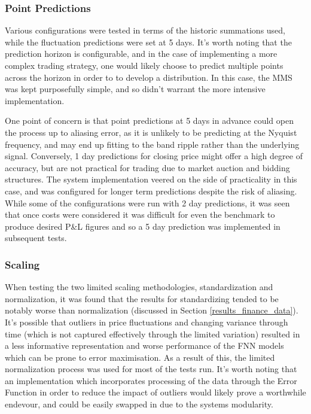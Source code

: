 \documentclass[a4paper,11pt,oneside]{article}
\theoremstyle{plain}
\theoremstyle{definition}
\begin{document}
	\subsubsection {Point Predictions} Various configurations were tested in terms of the historic summations used, while the fluctuation predictions were set at 5 days. It's worth noting that the prediction horizon is configurable, and in the case of implementing a more complex trading strategy, one would likely choose to predict multiple points across the horizon in order to to develop a distribution. In this case, the MMS was kept purposefully simple, and so didn't warrant the more intensive implementation. \newline
	
	One point of concern is that point predictions at 5 days in advance could open the process up to aliasing error, as it is unlikely to be predicting at the Nyquist frequency, and may end up fitting to the band ripple rather than the underlying signal. Conversely, 1 day predictions for closing price might offer a high degree of accuracy, but are not practical for trading due to market auction and bidding structures. The system implementation veered on the side of practicality in this case, and was configured for longer term predictions despite the risk of aliasing. While some of the configurations were run with 2 day predictions, it was seen that once costs were considered it was difficult for even the benchmark to produce desired P\&L figures and so a 5 day prediction was implemented in subsequent tests.
	
	
	
	\subsubsection {Scaling} When testing the two limited scaling methodologies, standardization and normalization, it was found that the results for standardizing tended to be notably worse than normalization (discussed in Section \ref{results_finance_data}). It's possible that outliers in price fluctuations and changing variance through time (which is not captured effectively through the limited variation) resulted in a less informative representation and worse performance of the FNN models which can be prone to error maximisation. As a result of this, the limited normalization process was used for most of the tests run. It's worth noting that an implementation which incorporates processing of the data through the Error Function in order to reduce the impact of outliers would likely prove a worthwhile endevour, and could be easily swapped in due to the systems modularity.\newline
	
\end{document}

